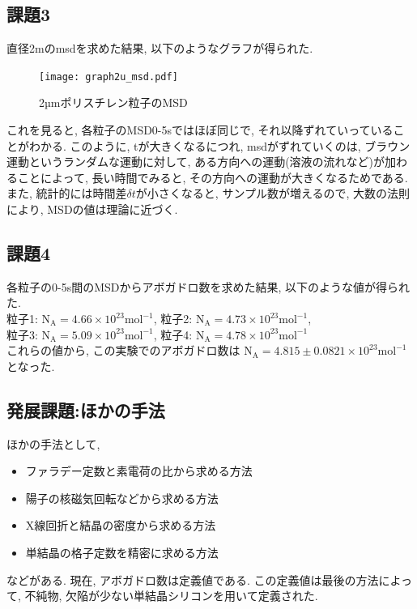 \documentclass[11pt]{ltjsarticle}
\begin{document}
    \subsection*{課題3}
      直径2\mu mのmsdを求めた結果, 以下のようなグラフが得られた.\\
      \begin{figure}[H]
        \centering
        \texttt{[image: graph2u\_msd.pdf]}
        \caption{2µmポリスチレン粒子のMSD}
        \label{fig:2ps_msd}
      \end{figure}
    これを見ると, 各粒子のMSD0-5sではほぼ同じで, それ以降ずれていっていることがわかる.
    このように, tが大きくなるにつれ, msdがずれていくのは, ブラウン運動というランダムな運動に対して, ある方向への運動(溶液の流れなど)が加わることによって, 長い時間でみると, その方向への運動が大きくなるためである.\\
    また, 統計的には時間差$\delta t$が小さくなると, サンプル数が増えるので, 大数の法則により, MSDの値は理論に近づく.
    \subsection*{課題4}
      各粒子の0-5s間のMSDからアボガドロ数を求めた結果, 以下のような値が得られた.\\
      粒子1: $\mathrm{N_A} = 4.66 \times 10^{23} \mathrm{mol^{-1}}$,
      粒子2: $\mathrm{N_A} = 4.73 \times 10^{23} \mathrm{mol^{-1}}$,\\
      粒子3: $\mathrm{N_A} = 5.09 \times 10^{23} \mathrm{mol^{-1}}$,
      粒子4: $\mathrm{N_A} = 4.78 \times 10^{23} \mathrm{mol^{-1}}$\\
      これらの値から, この実験でのアボガドロ数は
      $\mathrm{N_A} = 4.815\pm0.0821 \times 10^{23} \mathrm{mol^{-1}}$となった.
    \subsection*{発展課題:ほかの手法}
      ほかの手法として, 
      \begin{itemize}
        \item ファラデー定数と素電荷の比から求める方法
        \item 陽子の核磁気回転などから求める方法
        \item X線回折と結晶の密度から求める方法
        \item 単結晶の格子定数を精密に求める方法
      \end{itemize}
      などがある. 現在, アボガドロ数は定義値である. この定義値は最後の方法によって, 不純物, 欠陥が少ない単結晶シリコンを用いて定義された.
\end{document}

